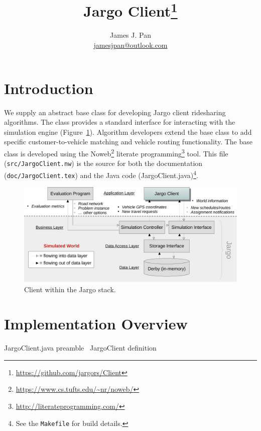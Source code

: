 \documentclass{article}
\title{Jargo Client\footnote{\url{https://github.com/jargors/Client}}}
\author{James J. Pan\\
  \small{\href{mailto:jamesjpan@outlook.com}{jamesjpan@outlook.com}}
}
\def\nwendcode{\endtrivlist \endgroup}
\let\nwdocspar=\par
\begin{document}
\maketitle
\pagestyle{noweb}

\tableofcontents

\section{Introduction}
\label{sec:introduction}
We supply an abstract base class for developing Jargo client ridesharing
algorithms. The class provides a standard interface for interacting with the
simulation engine (Figure~\ref{fig:client}). Algorithm developers extend the
base class to add specific customer-to-vehicle matching and vehicle routing
functionality.
The base class is developed using the
Noweb\footnote{\url{https://www.cs.tufts.edu/~nr/noweb/}} literate
programming\footnote{\url{http://literateprogramming.com/}} tool.  This file
({\tt{}src/JargoClient.nw}) is the source for both the documentation
({\tt{}doc/JargoClient.tex}) and the Java code (JargoClient.java)\footnote{See the
{\tt{}Makefile} for build details.}.

\begin{figure}[h]
\centering
\includegraphics[width=150mm]{src/fig/client-fig}
\caption{Client within the Jargo stack.}
\label{fig:client}
\end{figure}

\section{Implementation Overview}
\endmoddef{}
  \LA{}JargoClient.java preamble~{\nwtagstyle{}}\RA{}
  \LA{}\code{}JargoClient\edoc{} definition~{\nwtagstyle{}}\RA{}
\nwendcode{}\nwdocspar
\end{document}

